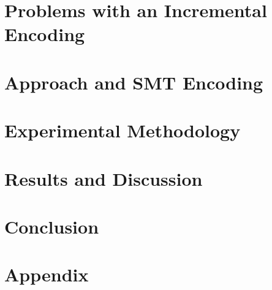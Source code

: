 \documentclass[sigconf]{acmart}
\begin{document}
\section{Problems with an Incremental Encoding}

%
\section{Approach and SMT Encoding}

%
\section{Experimental Methodology}

%
\section{Results and Discussion}


\section{Conclusion}






\appendix
\section{Appendix}%
\label{appendix:source-code-listings}

\end{document}
